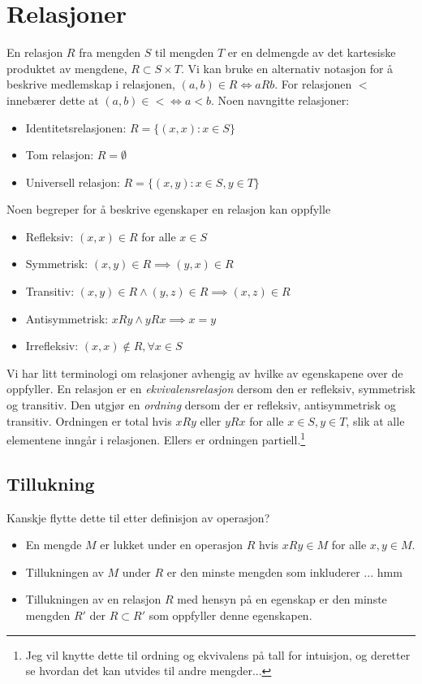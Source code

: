 \section{Relasjoner}
En relasjon $R$ fra mengden $S$ til mengden $T$ er en delmengde av det kartesiske produktet av mengdene, $R \subset S \times T$. Vi kan bruke en alternativ notasjon for å beskrive medlemskap i relasjonen, $(a,b) \in R \iff aRb$. For relasjonen $<$ innebærer dette at $(a,b) \in < \iff a<b$. Noen navngitte relasjoner:
\begin{itemize}
\item Identitetsrelasjonen: $R=\{(x,x):x\in S\}$
\item Tom relasjon: $R=\emptyset$
\item Universell relasjon: $R=\{(x,y):x\in S, y\in T\}$
\end{itemize}
Noen begreper for å beskrive egenskaper en relasjon kan oppfylle
\begin{itemize}
\item Refleksiv: $(x,x) \in R$ for alle $x\in S$
\item Symmetrisk: $(x,y) \in R \implies (y,x) \in R$
\item Transitiv: $(x,y) \in R \land (y,z) \in R \implies (x,z) \in R$
\item Antisymmetrisk: $xRy \land yRx \implies x=y$
\item Irrefleksiv: $(x,x) \notin R, \forall x \in S$
\end{itemize}
Vi har litt terminologi om relasjoner avhengig av hvilke av egenskapene over de oppfyller. En relasjon er en \textit{ekvivalensrelasjon} dersom den er refleksiv, symmetrisk og transitiv. Den utgjør en \textit{ordning} dersom der er refleksiv, antisymmetrisk og transitiv. Ordningen er total hvis $xRy$ eller $yRx$ for alle $x\in S, y\in T$, slik at alle elementene inngår i relasjonen. Ellers er ordningen partiell.\footnote{Jeg vil knytte dette til ordning og ekvivalens på tall for intuisjon, og deretter se hvordan det kan utvides til andre mengder...}
\subsection{Tillukning}
Kanskje flytte dette til etter definisjon av operasjon?
\begin{itemize}
\item En mengde $M$ er lukket under en operasjon $R$ hvis $xRy \in M$ for alle $x,y \in M$.
\item Tillukningen av $M$ under $R$ er den minste mengden som inkluderer ... hmm
\item Tillukningen av en relasjon $R$ med hensyn på en egenskap er den minste mengden $R'$ der $R\subset R'$ som oppfyller denne egenskapen.
\end{itemize}
